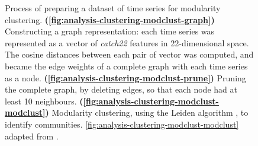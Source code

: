 \begin{figure}
  \caption[
    Modularity clustering visualises natural groupings of time series
  ]{
    Process of preparing a dataset of time series for modularity clustering.
    \textbf{(\ref{fig:analysis-clustering-modclust-graph})}
    Constructing a graph representation: each time series was represented as a vector of \textit{catch22} features in 22-dimensional space.
    The cosine distances between each pair of vector was computed, and became the edge weights of a complete graph with each time series as a node.
    \textbf{(\ref{fig:analysis-clustering-modclust-prune})}
    Pruning the complete graph, by deleting edges, so that each node had at least 10 neighbours.
    \textbf{(\ref{fig:analysis-clustering-modclust-modclust})}
    Modularity clustering, using the Leiden algorithm \parencite{traagLouvainLeidenGuaranteeing2019}, to identify communities.
    \ref{fig:analysis-clustering-modclust-modclust} adapted from \textcite{newmanModularityCommunityStructure2006}.
  }
  \label{fig:analysis-clustering-modclust}
\end{figure}



